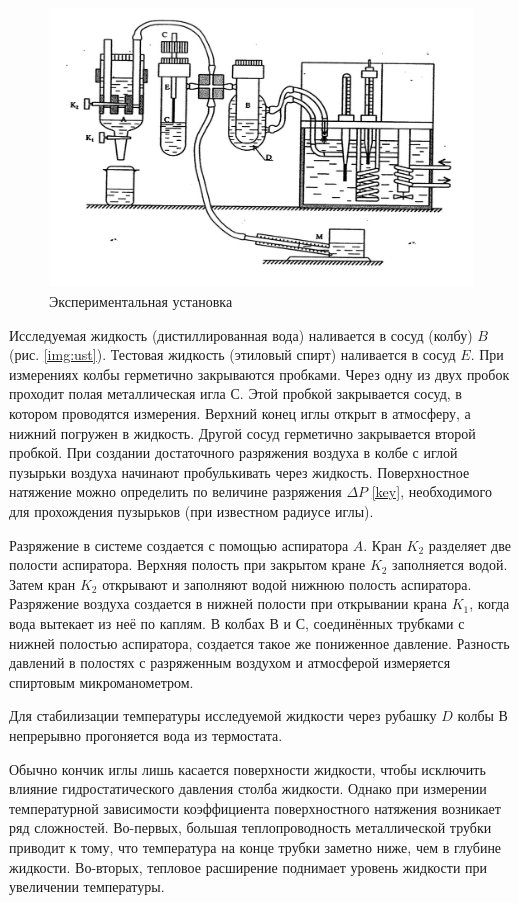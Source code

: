 \documentclass[a4paper,12pt]{article}
\begin{document}
    \begin{figure}[!ht]
        \begin{center}
            \includegraphics[width=0.6 \textwidth]{ust.jpg}
        \end{center}
        \caption{Экспериментальная установка}
                \label{img:ust}
    \end{figure}

    Исследуемая жидкость (дистиллированная вода) наливается в сосуд (колбу) $ B $ (рис. \eqref{img:ust}). Тестовая жидкость  (этиловый спирт) наливается  в сосуд $ E $.  При измерениях  колбы герметично закрываются  пробками. Через одну из двух пробок  проходит полая металлическая игла $ С $. Этой пробкой закрывается сосуд, в котором  проводятся измерения. Верхний конец иглы открыт в атмосферу, а нижний погружен в жидкость. Другой сосуд герметично закрывается второй пробкой. При создании достаточного  разряжения воздуха в колбе с иглой пузырьки воздуха начинают пробулькивать через жидкость. Поверхностное натяжение можно определить по величине разряжения $ \Delta P $ \eqref{key}, необходимого для прохождения пузырьков (при известном радиусе иглы).

	Разряжение в системе создается с помощью аспиратора $ A $. Кран $ K_2 $ разделяет две полости аспиратора. Верхняя полость при закрытом кране $ K_2 $ заполняется водой. Затем кран $ K_2 $ открывают и заполняют водой  нижнюю полость  аспиратора.  Разряжение воздуха создается в нижней полости  при открывании крана $ K_1 $, когда  вода вытекает из неё по каплям. В колбах $ В $ и $ С $, соединённых трубками с нижней полостью аспиратора, создается такое же пониженное давление. Разность давлений в полостях с разряженным воздухом и атмосферой измеряется спиртовым микроманометром.

	Для стабилизации температуры исследуемой жидкости через рубашку $ D $ колбы $ В $ непрерывно прогоняется вода из термостата.

	Обычно кончик иглы лишь касается поверхности жидкости, чтобы исключить влияние гидростатического давления столба жидкости. Однако при измерении температурной зависимости коэффициента поверхностного натяжения возникает ряд сложностей. Во-первых, большая теплопроводность металлической трубки приводит к тому, что температура на конце трубки заметно ниже, чем в глубине жидкости. Во-вторых, тепловое расширение поднимает уровень жидкости при увеличении температуры.
\end{document}
